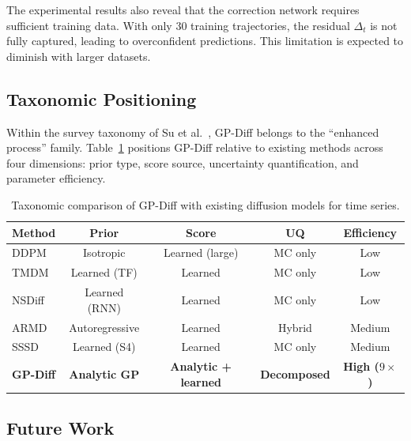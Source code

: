 \documentclass[conference]{IEEEtran}
\begin{document}
The experimental results also reveal that the correction network requires sufficient training data. With only 30 training trajectories, the residual $\Delta_t$ is not fully captured, leading to overconfident predictions. This limitation is expected to diminish with larger datasets.

\subsection{Taxonomic Positioning}

Within the survey taxonomy of Su et al.~\cite{Su2025Survey}, GP-Diff belongs to the ``enhanced process'' family. Table~\ref{tab:comparison} positions GP-Diff relative to existing methods across four dimensions: prior type, score source, uncertainty quantification, and parameter efficiency.

\begin{table}[t]
\centering
\caption{Taxonomic comparison of GP-Diff with existing diffusion models for time series.}
\label{tab:comparison}
\begin{tabular}{lcccc}
\toprule
\textbf{Method} & \textbf{Prior} & \textbf{Score} & \textbf{UQ} & \textbf{Efficiency} \\
\midrule
DDPM~\cite{Ho2020DDPM} & Isotropic & Learned (large) & MC only & Low \\
TMDM~\cite{TMDM} & Learned (TF) & Learned & MC only & Low \\
NSDiff~\cite{NSDiff} & Learned (RNN) & Learned & MC only & Low \\
ARMD~\cite{ARMD} & Autoregressive & Learned & Hybrid & Medium \\
SSSD~\cite{Alcaraz2022SSSD} & Learned (S4) & Learned & MC only & Medium \\
\textbf{GP-Diff} & \textbf{Analytic GP} & \textbf{Analytic + learned} & \textbf{Decomposed} & \textbf{High ($9\times$)} \\
\bottomrule
\end{tabular}
\end{table}

\subsection{Future Work}
\end{document}
